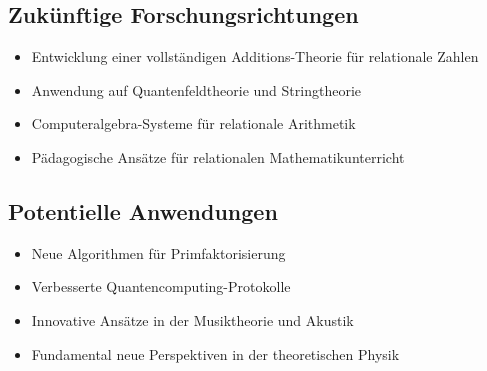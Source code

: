 \documentclass[11pt,a4paper]{article}
\begin{document}
	\subsection{Zukünftige Forschungsrichtungen}
	
	\begin{itemize}
		\item Entwicklung einer vollständigen Additions-Theorie für relationale Zahlen
		\item Anwendung auf Quantenfeldtheorie und Stringtheorie
		\item Computeralgebra-Systeme für relationale Arithmetik
		\item Pädagogische Ansätze für relationalen Mathematikunterricht
	\end{itemize}
	
	\subsection{Potentielle Anwendungen}
	
	\begin{itemize}
		\item Neue Algorithmen für Primfaktorisierung
		\item Verbesserte Quantencomputing-Protokolle
		\item Innovative Ansätze in der Musiktheorie und Akustik
		\item Fundamental neue Perspektiven in der theoretischen Physik
	\end{itemize}
	
\end{document}
